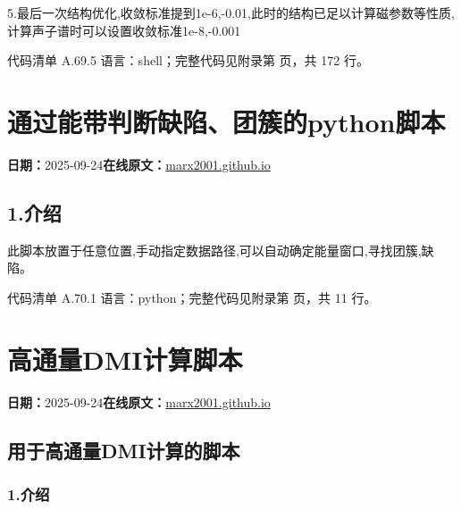 \documentclass[lang=cn,scheme=chinese,color=blue,device=normal,toc=onecol,math=cm]{elegantbook}
\begin{document}
5.最后一次结构优化,收敛标准提到1e-6,-0.01,此时的结构已足以计算磁参数等性质,计算声子谱时可以设置收敛标准1e-8,-0.001\par


\begin{codeindexbox}{代码清单 A.69.5}
语言：shell；完整代码见附录第 \pageref{code:69:5} 页，共 172 行。
\end{codeindexbox}



\section{通过能带判断缺陷、团簇的python脚本}
\begin{articlemeta}
\textbf{日期：}2025-09-24\hfill\textbf{在线原文：}\href{https://marx2001.github.io/sci-note\_posts/20250924-pyprocar}{marx2001.github.io}
\end{articlemeta}

\subsection{1.介绍}


此脚本放置于任意位置,手动指定数据路径,可以自动确定能量窗口,寻找团簇,缺陷。\par


\begin{codeindexbox}{代码清单 A.70.1}
语言：python；完整代码见附录第 \pageref{code:70:1} 页，共 11 行。
\end{codeindexbox}



\section{高通量DMI计算脚本}
\begin{articlemeta}
\textbf{日期：}2025-09-24\hfill\textbf{在线原文：}\href{https://marx2001.github.io/sci-note\_posts/20250924-scripts/}{marx2001.github.io}
\end{articlemeta}

\subsection{用于高通量DMI计算的脚本}


\subsubsection{1.介绍}
\end{document}

